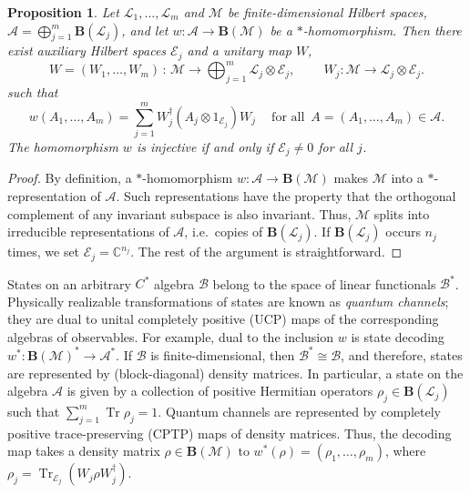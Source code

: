 \documentclass[12pt]{article}
\newcommand{\CC}{\mathbb{C}}
\newcommand{\calA}{\mathcal{A}}
\newcommand{\calB}{\mathcal{B}}
\newcommand{\calE}{\mathcal{E}}
\newcommand{\calL}{\mathcal{L}}
\newcommand{\calM}{\mathcal{M}}
\DeclareMathOperator{\Tr}{Tr}
\newcommand{\Bo}{\mathbf{B}}
\newtheorem{Proposition}[Theorem]{Proposition}
\newtheorem[definition]{Definition}[Theorem]{Definition}
\newtheorem[remark]{Example}[Theorem]{Example}
\newtheorem[remark]{Remark}[Theorem]{Remark}
\newtheorem[remark]{Question}[Theorem]{Open question}
\newtheorem*[definition]{definition}{Definition}
\newtheorem*[remark]{example}{Example}
\newtheorem*[remark]{remark}{Remark}
\newtheorem*[remark]{question}{Open question}
\numberwithin{equation}{section}
\begin{document}
\begin{Proposition}\label{prop_hom_structure}
Let $\calL_1,\dots,\calL_m$ and $\calM$ be finite-dimensional Hilbert spaces, $\calA=\bigoplus_{j=1}^{m}\Bo(\calL_j)$, and let $w\colon\calA\to\Bo(\calM)$ be a $*$-homomorphism. Then there exist auxiliary Hilbert spaces $\calE_j$ and a unitary map $W$,
\begin{equation}\label{partial_dec}
W=(W_1,\dots,W_m)\,\colon\,
\calM\to\bigoplus_{j=1}^{m}\calL_j\otimes\calE_j,\qquad\:
W_j\colon\calM\to\calL_j\otimes\calE_j.
\end{equation}
such that
\begin{equation}
w(A_1,\dots,A_m)=\sum_{j=1}^{m}W_j^\dag(A_j\otimes 1_{\calE_j})W_j\quad\:
\text{for all }\, A=(A_1,\dots,A_m)\in\calA.
\end{equation}
The homomorphism $w$ is injective if and only if $\calE_j\not=0$ for all $j$.
\end{Proposition}
\begin{proof}
By definition, a $*$-homomorphism $w\colon\calA\to\Bo(\calM)$ makes $\calM$ into a $*$-representation of $\calA$. Such representations have the property that the orthogonal complement of any invariant subspace is also invariant. Thus, $\calM$ splits into irreducible representations of $\calA$, i.e.\ copies of $\Bo(\calL_j)$. If $\Bo(\calL_j)$ occurs $n_j$ times, we set $\calE_j=\CC^{n_j}$. The rest of the argument is straightforward.
\end{proof}

States on an arbitrary $C^*$ algebra $\calB$ belong to the space of linear functionals $\calB^*$. Physically realizable transformations of states are known as \emph{quantum channels}; they are dual to unital completely positive (UCP) maps of the corresponding algebras of observables. For example, dual to the inclusion $w$ is state decoding $w^*\colon\Bo(\calM)^*\to\calA^*$. If $\calB$ is finite-dimensional, then $\calB^*\cong\calB$, and therefore, states are represented by (block-diagonal) density matrices. In particular, a state on the algebra $\calA$ is given by a collection of positive Hermitian operators $\rho_j\in\Bo(\calL_j)$ such that $\sum_{j=1}^{m}\Tr\rho_j=1$. Quantum channels are represented by completely positive trace-preserving (CPTP) maps of density matrices. Thus, the decoding map takes a density matrix $\rho\in\Bo(\calM)$ to $w^*(\rho)=(\rho_1,\dots,\rho_m)$, where $\rho_j=\Tr_{\calE_j}(W_j\rho W_j^\dag)$. 
\end{document}
